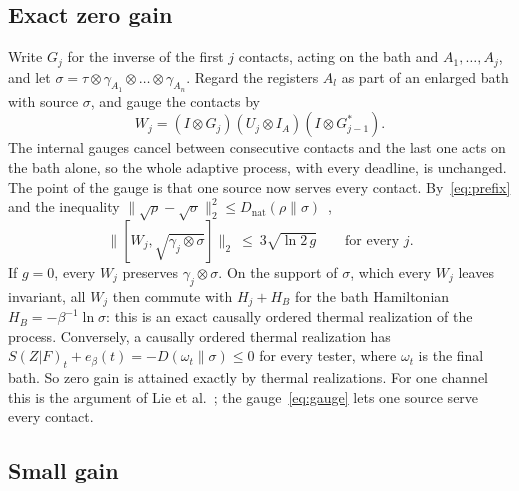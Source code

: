 \documentclass[11pt]{article}
\theoremstyle{definition}
\theoremstyle{remark}
\begin{document}
\subsection{Exact zero gain}

Write $G_j$ for the inverse of the first $j$ contacts, acting on the bath and $A_1,\dots,A_j$, and let $\sigma=\tau\otimes\gamma_{A_1}\otimes\dots\otimes\gamma_{A_n}$. Regard the registers $A_l$ as part of an enlarged bath with source $\sigma$, and gauge the contacts by
\begin{equation}\label{eq:gauge}
W_j=(I\otimes G_j)(U_j\otimes I_A)(I\otimes G_{j-1}^*).
\end{equation}
The internal gauges cancel between consecutive contacts and the last one acts on the bath alone, so the whole adaptive process, with every deadline, is unchanged. The point of the gauge is that one source now serves every contact. By~\eqref{eq:prefix} and the inequality $\|\sqrt\rho-\sqrt\sigma\|_2^2\le D_{\mathrm{nat}}(\rho\|\sigma)$~\cite{SaveWork},
\begin{equation}\label{eq:common}
\bigl\|[W_j,\sqrt{\gamma_j\otimes\sigma}]\bigr\|_2\ \le\ 3\sqrt{\ln2\,g}\qquad\text{for every }j.
\end{equation}
If $g=0$, every $W_j$ preserves $\gamma_j\otimes\sigma$. On the support of $\sigma$, which every $W_j$ leaves invariant, all $W_j$ then commute with $H_j+H_B$ for the bath Hamiltonian $H_B=-\beta^{-1}\ln\sigma$: this is an exact causally ordered thermal realization of the process. Conversely, a causally ordered thermal realization has $S(Z|F)_t+e_\beta(t)=-D(\omega_t\|\sigma)\le0$ for every tester, where $\omega_t$ is the final bath. So zero gain is attained exactly by thermal realizations. For one channel this is the argument of Lie et al.~\cite[Prop.~4]{LieEtAl26}; the gauge~\eqref{eq:gauge} lets one source serve every contact.

\subsection{Small gain}
\end{document}
